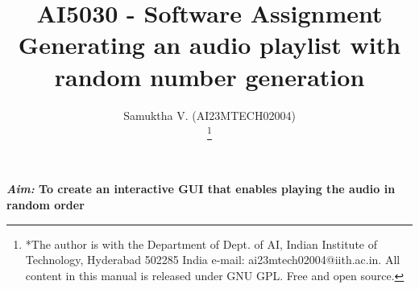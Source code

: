 \documentclass[journal,12pt,twocolumn]{IEEEtran}
\begin{document}
\vspace{3cm}

\title{
AI5030 - Software Assignment\\
Generating an audio playlist with random number generation%
}
\author{ Samuktha V. (AI23MTECH02004)

	\thanks{*The author is with the Department
		of Dept. of AI, Indian Institute of Technology, Hyderabad
		502285 India e-mail:  ai23mtech02004@iith.ac.in. All content in this manual is released under GNU GPL.  Free and open source.}
}

\maketitle

\newpage
\textbf{\emph{Aim:} To create an interactive GUI that enables playing the audio in random order}
\newline
\end{document}
